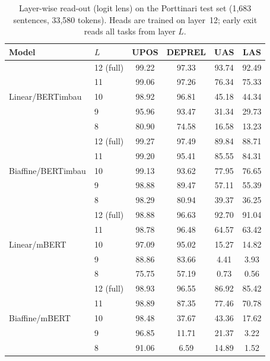 
\begin{table}[t]
\centering
\caption{Layer-wise read-out (logit lens) on the Porttinari test set (1,683 sentences, 33,580 tokens). Heads are trained on layer~12; early exit reads all tasks from layer $L$.}
\label{tab:early-exit}
\begin{tabular}{llcccc}
\toprule
Model & $L$ & UPOS & DEPREL & UAS & LAS \\
\midrule
\multirow{5}{*}{Linear/BERTimbau} & 12 (full) & 99.22 & 97.33 & 93.74 & 92.49 \\
 & 11 & 99.06 & 97.26 & 76.34 & 75.33 \\
 & 10 & 98.92 & 96.81 & 45.18 & 44.34 \\
 & 9 & 95.96 & 93.47 & 31.34 & 29.73 \\
 & 8 & 80.90 & 74.58 & 16.58 & 13.23 \\
\midrule
\multirow{5}{*}{Biaffine/BERTimbau} & 12 (full) & 99.27 & 97.49 & 89.84 & 88.71 \\
 & 11 & 99.20 & 95.41 & 85.55 & 84.31 \\
 & 10 & 99.13 & 93.62 & 77.95 & 76.65 \\
 & 9 & 98.88 & 89.47 & 57.11 & 55.39 \\
 & 8 & 98.29 & 80.94 & 39.37 & 36.25 \\
\midrule
\multirow{5}{*}{Linear/mBERT} & 12 (full) & 98.88 & 96.63 & 92.70 & 91.04 \\
 & 11 & 98.78 & 96.48 & 64.57 & 63.42 \\
 & 10 & 97.09 & 95.02 & 15.27 & 14.82 \\
 & 9 & 88.86 & 83.66 & 4.41 & 3.93 \\
 & 8 & 75.75 & 57.19 & 0.73 & 0.56 \\
\midrule
\multirow{5}{*}{Biaffine/mBERT} & 12 (full) & 98.93 & 96.55 & 86.92 & 85.42 \\
 & 11 & 98.89 & 87.35 & 77.46 & 70.78 \\
 & 10 & 98.48 & 37.67 & 43.36 & 17.62 \\
 & 9 & 96.85 & 11.71 & 21.37 & 3.22 \\
 & 8 & 91.06 & 6.59 & 14.89 & 1.52 \\
\bottomrule
\end{tabular}
\end{table}

